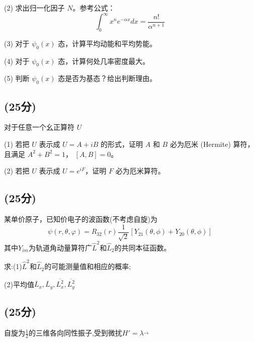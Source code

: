 (2) 求出归一化因子 $N$。参考公式：
\[\int_0^\infty x^n e^{- \alpha x} dx = \frac{n!}{\alpha^{n+1}}~\]

(3) 对于 $\psi_0(x)$ 态，计算平均动能和平均势能。

(4) 对于 $\psi_0(x)$ 态，计算何处几率密度最大。

(5) 判断 $\psi_0(x)$ 态是否为基态？给出判断理由。
\subsection{(25分)}
对于任意一个幺正算符 \( U \)

(1) 若把 \( U \) 表示成 \( U = A + iB \) 的形式，证明 \( A \) 和 \( B \) 必为厄米 (Hermite) 算符，且满足 \( A^2 + B^2 = 1 \)， \([A, B] = 0 \)。

(2) 若把 \( U \) 表示成 \( U = e^{iF} \)，证明 \( F \) 必为厄米算符。
\subsection{(25分)}
某单价原子，已知价电子的波函数(不考虑自旋)为
$$\psi(r,\theta,\varphi)=R_{32}(r)\frac{1}{\sqrt{2}}[Y_{21}(\theta,\phi)+Y_{20}(\theta,\phi)]~$$
其中$Y_{im}$为轨道角动量算符广$\hat{L}^2$和$\hat{L}_2$的共同本征函数。

求:(1)$\hat{L}^2$和$\hat{L}_2$的可能测量值和相应的概率;

(2)平均值$\overline{L}_x,\overline{L}_y,\overline{L^2_x},\overline{L^2_y}$
\subsection{(25分)}
自旋为$\frac{1}{2}$的三维各向同性振子,受到微扰$H'=\lambda \vec{}$